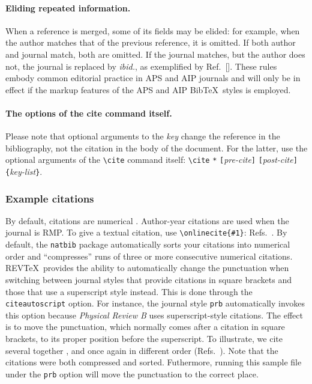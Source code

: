 \documentclass[%
 preprint, linenumbers,
 amsmath,amssymb,
 aps, physrev,
]{revtex4-2}
\begin{document}
\paragraph{Eliding repeated information.}
When a reference is merged, some of its fields may be elided: for example, 
when the author matches that of the previous reference, it is omitted. 
If both author and journal match, both are omitted.
If the journal matches, but the author does not, the journal is replaced by \emph{ibid.},
as exemplified by Ref.~[]. 
These rules embody common editorial practice in APS and AIP journals and will only
be in effect if the markup features of the APS and AIP Bib\TeX\ styles is employed.

\paragraph{The options of the cite command itself.}
Please note that optional arguments to the \emph{key} change the reference in the bibliography, 
not the citation in the body of the document. 
For the latter, use the optional arguments of the \verb+\cite+ command itself:
\verb+\cite+ \texttt{*}\allowbreak
\texttt{[}\emph{pre-cite}\texttt{]}\allowbreak
\texttt{[}\emph{post-cite}\texttt{]}\allowbreak
\verb+{+\emph{key-list}\verb+}+.

\subsubsection{Example citations}
By default, citations are numerical \cite{Beutler1994}.
Author-year citations are used when the journal is RMP. 
To give a textual citation, use \verb+\onlinecite{#1}+: 
Refs.~. 
By default, the \texttt{natbib} package automatically sorts your citations into numerical order and ``compresses'' runs of three or more consecutive numerical citations.
REV\TeX\ provides the ability to automatically change the punctuation when switching between journal styles that provide citations in square brackets and those that use a superscript style instead. This is done through the \texttt{citeautoscript} option. For instance, the journal style \texttt{prb} automatically invokes this option because \textit{Physical 
Review B} uses superscript-style citations. The effect is to move the punctuation, which normally comes after a citation in square brackets, to its proper position before the superscript. 
To illustrate, we cite several together 
\cite{[See the explanation of time travel in ]feyn54,*[The classical relativistic treatment of ][ is a relative classic]epr,witten2001,Berman1983,Davies1998,Bire82}, 
and once again in different order (Refs.~\cite{epr,feyn54,Bire82,Berman1983,witten2001,Davies1998}). 
Note that the citations were both compressed and sorted. Futhermore, running this sample file under the \texttt{prb} option will move the punctuation to the correct place.
\end{document}
